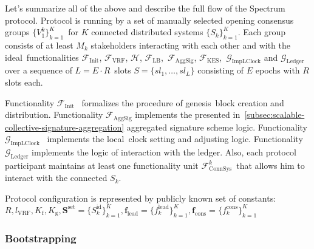 Let's summarize all of the above and describe the full flow of the Spectrum protocol.
Protocol is running by a set of manually selected opening consensus groups $\{V^k_1\}_{k=1}^K$\
for $K$ connected distributed systems $\{S_k\}_{k=1}^K$.
Each group consists of at least $M_k$ stakeholders interacting with each other and with the ideal\
functionalities $\mathcal{F}_{\text{Init}}$, ${\mathcal{F}}_{\text{VRF}}$, $\mathcal{H}$, ${\mathcal{F}}_{\text{LB}}$,\
$\mathcal{F}_{\text{AggSig}}$, ${\mathcal{F}}_{\text{KES}}$,\
$\mathcal{G}_{\text{ImpLClock}}$ and $\mathcal{G}_{\text{Ledger}}$ over a sequence of $L = E \cdot R$\
slots ${S=\{sl_1,\dots,sl_L\}}$ consisting of $E$ epochs with $R$ slots each.

Functionality ${\mathcal{F}}_{\text{Init}}$~\cite{Badertscher2018} formalizes the procedure of genesis\
block creation and distribution.
Functionality ${\mathcal{F}}_{\text{AggSig}}$ implements the presented in~\ref{subsec:scalable-collective-signature-aggregation} aggregated signature scheme logic.
Functionality $\mathcal{G}_{\text{ImpLClock}}$~\cite{cryptoeprint:2019/838} implements the local\
clock setting and adjusting logic.
Functionality $\mathcal{G}_{\text{Ledger}}$ implements the logic of interaction with the ledger.
Also, each protocol participant maintains at least one functionality unit $\mathcal{F}^k_{\text{ConnSys}}$\
that allows him to interact with the connected $S_k$.

Protocol configuration is represented by publicly known set of constants:\
$R, l_{\text{VRF}}, K_{\text{f}}, K_{\text{g}}, \mathbf{S}^{\text{set}} = \{S_k^{\text{id}}\}_{k=1}^K, \mathbf{f}_{\text{lead}} = \{f^{\text{lead}}_k\}_{k=1}^K, \mathbf{f}_{\text{cons}} = \{f^{\text{cons}}_k\}_{k=1}^K$

\subsubsection{Bootstrapping}\label{subsubsec:bootstrapping}

